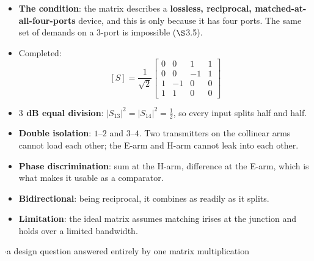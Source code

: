 \vspace{2pt}
\begin{itemize}
  \item \textbf{The condition}: the matrix describes a \textbf{lossless, reciprocal,
    matched-at-all-four-ports} device, and this is  only because it has
    four ports. The same set of demands on a 3-port is impossible ($\S$3.5).
  \item Completed:
    \[ [S] = \frac{1}{\sqrt{2}}\begin{bmatrix}
       0&0&1&1 \\ 0&0&-1&1 \\ 1&-1&0&0 \\ 1&1&0&0 \end{bmatrix} \]
\end{itemize}
\begin{itemize}
  \item \textbf{$3$ dB equal division}: $|S_{13}|^2 = |S_{14}|^2 = \tfrac{1}{2}$, so every
    input splits half and half.
  \item \textbf{Double isolation}: $1$--$2$ and $3$--$4$. Two transmitters on the
    collinear arms cannot load each other; the E-arm and H-arm cannot leak into each
    other.
  \item \textbf{Phase discrimination}: sum at the H-arm, difference at the E-arm, which
    is what makes it usable as a comparator.
  \item \textbf{Bidirectional}: being reciprocal, it combines as readily as it splits.
  \item \textbf{Limitation}: the ideal matrix assumes matching irises at the junction and
    holds over a limited bandwidth.
\end{itemize}

\vspace{2pt}

{\color{sub}\footnotesize {} \gap$\cdot$\gap a design question answered entirely by one matrix multiplication}

